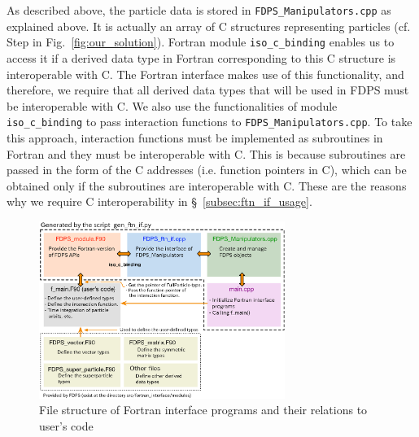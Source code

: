 \documentclass[twocolumn,useamsfonts]{pasj01}
\begin{document}
As described above, the particle data is stored in \texttt{FDPS\_Manipulators.cpp} as explained above. It is actually an array of C structures representing particles (cf. Step {\large {}\hbox{}} in Fig.~\ref{fig:our_solution}). Fortran module \texttt{iso\_c\_binding} enables us to access it if a derived data type in Fortran corresponding to this C structure is interoperable with C. The Fortran interface makes use of this functionality, and therefore, we require that all derived data types that will be used in FDPS must be interoperable with C. We also use the functionalities of module \texttt{iso\_c\_binding} to pass interaction functions to \texttt{FDPS\_Manipulators.cpp}. To take this approach, interaction functions must be implemented as subroutines in Fortran and they must be interoperable with C. This is because subroutines are passed in the form of the C addresses  (i.e. function pointers in C), which can be obtained only if the subroutines are interoperable with C. These are the reasons why we require C interoperability in \S~\ref{subsec:ftn_if_usage}.




\begin{figure}[h]
\begin{center}
\includegraphics[width=8cm]{figures/FDPS_ftn_if_file_str}
\end{center}
\caption{File structure of Fortran interface programs and their relations to user’s code}
\label{fig:file_str_ftn_if}  
\end{figure}




\end{document}
